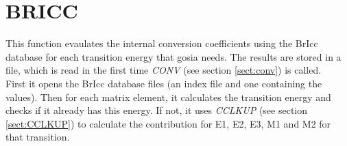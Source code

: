 \section{BRICC}
\label{sect:bricc}

\noindent This function evaulates the internal conversion coefficients
using the BrIcc database for each transition energy that gosia needs.
The results are stored in a file, which is read in the first time {\em
CONV} (see section \ref{sect:conv}) is called.\\

\noindent First it opens the BrIcc database files (an index file and
one containing the values). Then for each matrix element, it
calculates the transition energy and checks if it already has this
energy. If not, it uses {\em CCLKUP} (see section \ref{sect:CCLKUP})
to calculate the contribution for E1, E2, E3, M1 and M2 for that
transition.\\

